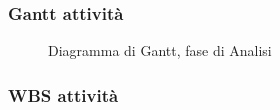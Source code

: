 \subsubsection{Gantt attività}
\begin{figure}[H]
\centering
{}
\caption{Diagramma di Gantt, fase di Analisi}
\end{figure}

\subsubsection{WBS attività}
\begin{figure}[H]
	\centering
    \scalebox{0.8}{}
\end{figure}

